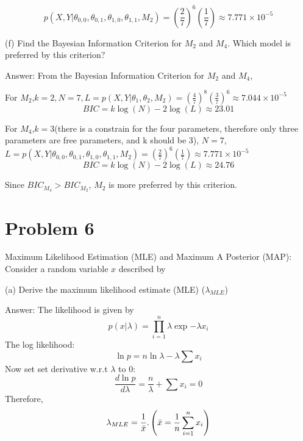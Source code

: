 \documentclass{article}
\begin{document}
\begin{equation}
    p(X,Y|\theta_{0,0},\theta_{0,1},\theta_{1,0},\theta_{1,1},M_{2})= (\frac{2}{7})^{6}(\frac{1}{7}) \approx 7.771 \times 10^{-5}
\end{equation}

(f) Find the Bayesian Information Criterion for $M_2$ and $M_4$. Which model is preferred by this criterion?

Answer:
From the Bayesian Information Criterion for $M_2$ and $M_4$,

For $M_2$,$k=2, N=7, L = p(X,Y|\theta_{1},\theta_{2},M_{2})= (\frac{4}{7})^{8}(\frac{3}{7})^{6} \approx 7.044 \times 10^{-5} $
\begin{equation}
    BIC =  k\log(N) -2 \log (L) \approx 23.01 
\end{equation}

For $M_4$,$k=3$(there is a constrain for the four parameters, therefore only three parameters are free parameters, and k should be 3), $N=7$, $L =  p(X,Y|\theta_{0,0},\theta_{0,1},\theta_{1,0},\theta_{1,1},M_{2})= (\frac{2}{7})^{6}(\frac{1}{7}) \approx 7.771 \times 10^{-5} $
\begin{equation}
    BIC =  k\log(N) -2 \log (L) \approx 24.76
\end{equation}

Since $BIC_{M_4} > BIC_{M_2} $, $M_2$ is more preferred by this criterion.

\newpage
\section{Problem 6}
Maximum Likelihood Estimation (MLE) and Maximum A Posterior (MAP):
Consider a random variable $x$ described by 

(a) Derive the maximum likelihood estimate (MLE) ($\lambda_{MLE}$)

Answer:
The likelihood is given by
\begin{equation}
p(x|\lambda) = \prod_{i=1}^{n} \lambda \exp{-\lambda x_{i}}
\end{equation}
The log likelihood:
\begin{equation}
    \ln{p} = n \ln{\lambda} -\lambda \sum{x_i}
\end{equation}
Now set set derivative w.r.t $\lambda$ to $0$:
\begin{equation}
    \frac{d \ln{p}}{d \lambda} = \frac{n}{\lambda} + \sum{x_i} =0
\end{equation}
Therefore,
\begin{equation}
    \lambda_{MLE} = \frac{1}{\Bar{x}}. \left( \Bar{x} = \frac{1}{n} \sum_{i=1}^{n} x_{i} \right)
\end{equation}
\end{document}
